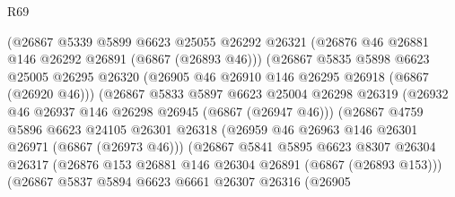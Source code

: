 \begin{lexlean}{R69}
\begin{coremodule}
{                              (@26867
                                @5339
                                @5899
                                @6623
                                @25055
                                @26292
                                @26321
                                (@26876 @46 @26881 @146 @26292 @26891 (@6867 (@26893 @46)))
                                (@26867
                                  @5835
                                  @5898
                                  @6623
                                  @25005
                                  @26295
                                  @26320
                                  (@26905 @46 @26910 @146 @26295 @26918 (@6867 (@26920 @46)))
                                  (@26867
                                    @5833
                                    @5897
                                    @6623
                                    @25004
                                    @26298
                                    @26319
                                    (@26932 @46 @26937 @146 @26298 @26945 (@6867 (@26947 @46)))
                                    (@26867
                                      @4759
                                      @5896
                                      @6623
                                      @24105
                                      @26301
                                      @26318
                                      (@26959 @46 @26963 @146 @26301 @26971 (@6867 (@26973 @46)))
                                      (@26867
                                        @5841
                                        @5895
                                        @6623
                                        @8307
                                        @26304
                                        @26317
                                        (@26876
                                          @153
                                          @26881
                                          @146
                                          @26304
                                          @26891
                                          (@6867 (@26893 @153)))
                                        (@26867
                                          @5837
                                          @5894
                                          @6623
                                          @6661
                                          @26307
                                          @26316
                                          (@26905
}
\end{coremodule}
\end{lexlean}
